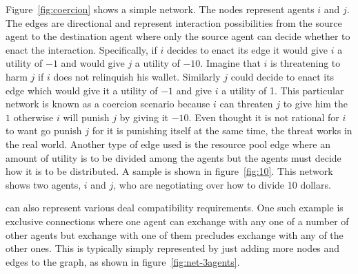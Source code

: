 \begin{SCfigure}
  \begin{minipage}{1.0\linewidth}
\begin{center}
\end{center}
  \end{minipage}
  \caption{The coercion network.}
  \label{fig:coercion}
\end{SCfigure}

Figure~\ref{fig:coercion} shows a simple  network. The nodes
represent agents $i$ and $j$. The edges are directional and represent
interaction possibilities from the source agent to the destination
agent where only the source agent can decide whether to enact the
interaction. Specifically, if $i$ decides to enact its edge it would
give $i$ a utility of $-1$ and would give $j$ a utility of $-10$.
Imagine that $i$ is threatening to harm $j$ if $i$ does not relinquish
his wallet.  Similarly $j$ could decide to enact its edge which would
give it a utility of $-1$ and give $i$ a utility of 1.  This
particular network is known as a coercion scenario because $i$ can
threaten $j$ to give him the $1$ otherwise $i$ will punish $j$ by
giving it $-10$. Even thought it is not rational for $i$ to want go
punish $j$ for it is punishing itself at the same time, the threat
works in the real world.  Another type of edge used is the resource
pool edge where an amount of utility is to be divided among the agents
but the agents must decide how it is to be distributed. A sample is
shown in figure~\ref{fig:10}. This network shows two agents, $i$ and
$j$, who are negotiating over how to divide 10 dollars.

 can also represent various deal compatibility requirements.
One such example is exclusive connections where one agent can exchange
with any one of a number of other agents but exchange with one of them
precludes exchange with any of the other ones. This is typically
simply represented by just adding more nodes and edges to the graph,
as shown in figure~\ref{fig:net-3agents}.

